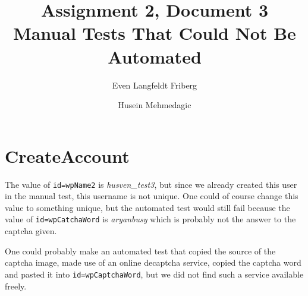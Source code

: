 \documentclass[a4paper,10pt]{article}
\title{Assignment 2, Document 3 \\ Manual Tests That Could Not Be Automated}
\author{Even Langfeldt Friberg \and Husein Mehmedagic}
\begin{document}
\maketitle

\section{CreateAccount}
The value of \texttt{id=wpName2} is \textit{husven\_test3}, but since we already created this user in the manual test, this username is not unique. One could of course 
change this value to something unique, but the automated test would still fail because the value of \texttt{id=wpCatchaWord} is \textit{aryanbusy} which is probably not 
the answer to the captcha given.

One could probably make an automated test that copied the source of the captcha image, made use of an online decaptcha service, copied the captcha word 
and pasted it into \texttt{id=wpCaptchaWord}, but we did not find such a service available freely.
\end{document}

